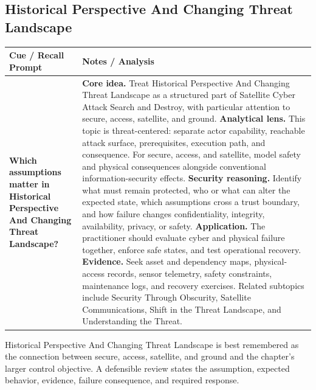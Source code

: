 \documentclass[11pt]{article}
\newcommand{\CornellHeader}{%
\rowcolor{Navy}\color{white}\bfseries Cue / Recall Prompt & \color{white}\bfseries Notes / Analysis\\\hline}
\newcommand{\CornellRow}[2]{%
\cellcolor{CueGray}\RaggedRight\textbf{#1} & \RaggedRight #2\\\hline}
\begin{document}
\subsection*{Historical Perspective And Changing Threat Landscape}
\begin{longtable}{>{\RaggedRight\arraybackslash}p{}|>{\RaggedRight\arraybackslash}p{}}
\CornellHeader
\CornellRow{Which assumptions matter in Historical Perspective And Changing Threat Landscape?}{\textbf{Core idea.} Treat Historical Perspective And Changing Threat Landscape as a structured part of Satellite Cyber Attack Search and Destroy, with particular attention to secure, access, satellite, and ground. \textbf{Analytical lens.} This topic is threat-centered: separate actor capability, reachable attack surface, prerequisites, execution path, and consequence. For secure, access, and satellite, model safety and physical consequences alongside conventional information-security effects. \textbf{Security reasoning.} Identify what must remain protected, who or what can alter the expected state, which assumptions cross a trust boundary, and how failure changes confidentiality, integrity, availability, privacy, or safety. \textbf{Application.} The practitioner should evaluate cyber and physical failure together, enforce safe states, and test operational recovery. \textbf{Evidence.} Seek asset and dependency maps, physical-access records, sensor telemetry, safety constraints, maintenance logs, and recovery exercises. Related subtopics include Security Through Obscurity, Satellite Communications, Shift in the Threat Landscape, and Understanding the Threat.}
\end{longtable}
\begin{topicsummary}
Historical Perspective And Changing Threat Landscape is best remembered as the connection between secure, access, satellite, and ground and the chapter's larger control objective. A defensible review states the assumption, expected behavior, evidence, failure consequence, and required response.
\end{topicsummary}
\end{document}
